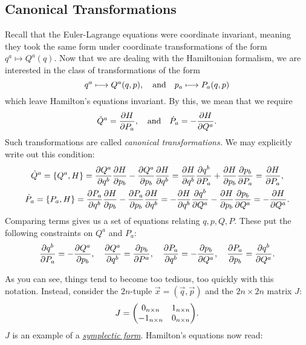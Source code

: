 \documentclass{article}
\begin{document}
\subsection{Canonical Transformations}
Recall that the Euler-Lagrange equations were coordinate invariant, meaning they took the same form under coordinate transformations of the form $ q^{a} \longmapsto Q^{a}(q) $. Now that we are dealing with the Hamiltonian formalism, we are interested in the class of transformations of the form
\begin{equation}
	q^{a} \longmapsto Q^{a}(q,p), \qq{and} p_{a} \longmapsto P_{a}(q,p)
\end{equation}
which leave Hamilton's equations invariant. By this, we mean that we require
\begin{equation}
	\dot{Q}^{a} = \pdv{H}{P_{a}}, \qq{and} \dot{P}_{a} = - \pdv{H}{Q^{a}}.
\end{equation}
Such transformations are called \textit{canonical transformations.} We may explicitly write out this condition:
\begin{gather}
	\dot{Q}^{a} = \qty{Q^{a}, H} =  \pdv{Q^{a}}{q^{b}}\pdv{H}{p_{b}} - \pdv{Q^{a}}{p_{b}} \pdv{H}{q^{b}} = \pdv{H}{q^{b}} \pdv{q^{b}}{P_{a}} + \pdv{H}{p_{b}}\pdv{p_{b}}{P_{a}} = \pdv{H}{P_{a}}, \\
	\dot{P}_{a} = \qty{P_{a}, H} =  \pdv{P_{a}}{q^{b}}\pdv{H}{p_{b}} - \pdv{P_{a}}{p_{b}} \pdv{H}{q^{b}} = -\pdv{H}{q^{b}} \pdv{q^{b}}{Q^{a}} - \pdv{H}{p_{b}}\pdv{p_{b}}{Q^{a}} = -\pdv{H}{Q^{a}}.
\end{gather}
Comparing terms gives us a set of equations relating $ q,p,Q,P $. These put the following constraints on $ Q^{a} $ and $ P_{a} $: 
\begin{equation}
	\pdv{q^{b}}{P_{a}} = -\pdv{Q^{a}}{p_{b}}, \quad
	\pdv{Q^{a}}{q^{b}} = \pdv{p_{b}}{P^{a}}, \quad
	\pdv{P_{a}}{q^{b}} = -\pdv{p_{b}}{Q^{a}}, \quad
	\pdv{P_{a}}{p_{b}} = \pdv{q^{b}}{Q^{a}}.
\end{equation}
\par
As you can see, things tend to become too tedious, too quickly with this notation. Instead, consider the $ 2n$-tuple $ \vec{x} = (\vec{q}, \vec{p}) $ and the $ 2n\times2n $ matrix $ J $:
\begin{equation}
	J = \mqty( 0_{n\times n} & 1_{n \times n} \\ -1_{n \times n} & 0_{n \times n} ).
\end{equation}
$ J $ is an example of a \href{https://en.wikipedia.org/wiki/Symplectic_vector_space}{\textit{symplectic form}}. Hamilton's equations now read:
\end{document}
